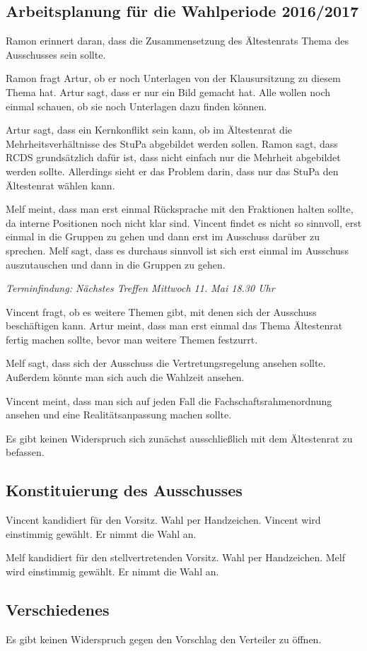 \documentclass[ngerman,headheight=70pt]{scrartcl}
\begin{document}
    \subsection{Arbeitsplanung für die Wahlperiode 2016/2017}

    Ramon erinnert daran, dass die Zusammensetzung des Ältestenrats
    Thema des Ausschusses sein sollte.

    Ramon fragt Artur, ob er noch Unterlagen von der Klausursitzung zu
    diesem Thema hat. Artur sagt, dass er nur ein Bild gemacht hat.
    Alle wollen noch einmal schauen, ob sie noch Unterlagen dazu finden
    können.

    Artur sagt, dass ein Kernkonflikt sein kann, ob im Ältestenrat
    die Mehrheitsverhältnisse des StuPa abgebildet werden sollen.
    Ramon sagt, dass RCDS grundsätzlich dafür ist, dass nicht einfach
    nur die Mehrheit abgebildet werden sollte. Allerdings sieht er
    das Problem darin, dass nur das StuPa den Ältestenrat wählen kann.

    Melf meint, dass man erst einmal Rücksprache mit den Fraktionen
    halten sollte, da interne Positionen noch nicht klar sind. Vincent
    findet es nicht so sinnvoll, erst einmal in die Gruppen zu gehen
    und dann erst im Ausschuss darüber zu sprechen. Melf sagt, dass
    es durchaus sinnvoll ist sich erst einmal im Ausschuss auszutauschen
    und dann in die Gruppen zu gehen.

    \textit{Terminfindung: Nächstes Treffen Mittwoch 11. Mai 18.30 Uhr}

    Vincent fragt, ob es weitere Themen gibt, mit denen sich der Ausschuss
    beschäftigen kann. Artur meint, dass man erst einmal das Thema
    Ältestenrat fertig machen sollte, bevor man weitere Themen festzurrt.

    Melf sagt, dass sich der Ausschuss die Vertretungsregelung ansehen
    sollte. Außerdem könnte man sich auch die Wahlzeit ansehen.

    Vincent meint, dass man sich auf jeden Fall die Fachschaftsrahmenordnung
    ansehen und eine Realitätsanpassung machen sollte.

    Es gibt keinen Widerspruch sich zunächst ausschließlich mit dem
    Ältestenrat zu befassen.

    \subsection{Konstituierung des Ausschusses}

    Vincent kandidiert für den Vorsitz. Wahl per Handzeichen.
    Vincent wird einstimmig gewählt. Er nimmt die Wahl an.

    Melf kandidiert für den stellvertretenden Vorsitz. Wahl per Handzeichen.
    Melf wird einstimmig gewählt. Er nimmt die Wahl an.

    \subsection{Verschiedenes}

    Es gibt keinen Widerspruch gegen den Vorschlag den Verteiler
    zu öffnen.
\end{document}
